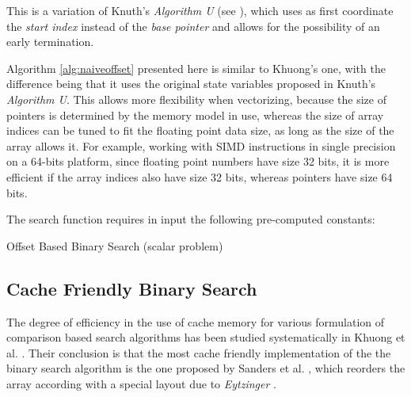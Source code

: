 \documentclass[preprint,1p,times]{elsarticle}
\begin{document}
This is a variation of Knuth's \textit{Algorithm U} (see \cite{Knuth1997}), which uses as first coordinate the \textit{start index} instead of the \textit{base pointer} and allows for the possibility of an early termination.  



Algorithm \ref{alg:naiveoffset} presented here is similar to Khuong's one, with the difference being that it uses the original state variables proposed in Knuth's \textit{Algorithm U}. This allows more flexibility when vectorizing, because the size of pointers is determined by the memory model in use, whereas the size of array indices can be tuned to fit the floating point data size, as long as the size of the array  allows it. For example, working with SIMD instructions in single precision on a 64-bits platform, since floating point numbers have size 32 bits, it is more efficient if the array indices also have size 32 bits, whereas pointers have size 64 bits.



The search function requires in input the following pre-computed constants:


\begin{algorithm}[ht]
	\caption{Offset Based Binary Search  (scalar problem)}
	\label{alg:naiveoffset}
	\begin{algorithmic}
		\Function {\ClassicOffsetName}{\fin ,  , , ,  \fout }
		
		\State 
		\If { }  
			\State  {}
		\EndIf
		\While {}
			\State {}
			\State {} 
			\State {}
			\If {}  
				\State {}
			\EndIf
			\State {}
		\EndWhile
		\EndFunction
	\end{algorithmic}
\end{algorithm}

\subsection{Cache Friendly Binary Search}
\label{sec:eytzinger}
The degree of efficiency in the use of cache memory for various formulation of comparison based search algorithms has been studied systematically in Khuong et al. \cite{Morin2015}. Their conclusion is that the most cache friendly implementation of the the binary search algorithm is the one proposed by Sanders et al. \cite{Sanders2004}, which reorders the array  according with a special layout due to \textit{Eytzinger} \cite{Eytzinger1590}.
\end{document}

